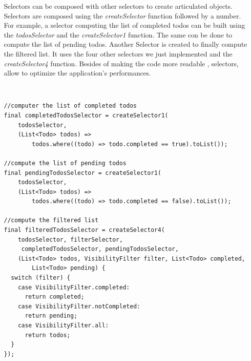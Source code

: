 Selectors can be composed with other selectors to create articulated objects. Selectors are composed using the \textit{createSelector} function followed by a number. For example, a selector computing the list of completed todos can be built using the \textit{todosSelector }and the \textit{createSelector1} function. The same con be done to compute the list of pending todos. Another Selector is created to finally compute the filtered list. It uses the four other selectors we just implemented and the \textit{createSelector4 }function. Besides of making the code more readable , selectors, allow to optimize the application's performances.
\begin{code}
\mbox{}\\
 \mbox{}
		\label{code:2.64}
\begin{verbatim}
//computer the list of completed todos
final completedTodosSelector = createSelector1(
    todosSelector,
    (List<Todo> todos) =>
        todos.where((todo) => todo.completed == true).toList());

//compute the list of pending todos
final pendingTodosSelector = createSelector1(
    todosSelector,
    (List<Todo> todos) =>
        todos.where((todo) => todo.completed == false).toList());

//compute the filtered list
final filteredTodosSelector = createSelector4(
    todosSelector, filterSelector,
     completedTodosSelector, pendingTodosSelector,
    (List<Todo> todos, VisibilityFilter filter, List<Todo> completed,
        List<Todo> pending) {
  switch (filter) {
    case VisibilityFilter.completed:
      return completed;
    case VisibilityFilter.notCompleted:
      return pending;
    case VisibilityFilter.all:
      return todos;
  }
});
\end{verbatim}
\mbox{}
\end{code}

